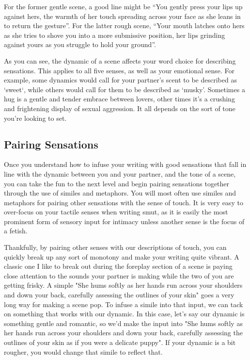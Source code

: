 ﻿\documentclass[Coomer-main.tex]{subfiles}
\begin{document}
For the former gentle scene, a good line might be “You gently press your lips up against hers, the warmth of her touch spreading across your face as she leans in to return the gesture”.
For the latter rough scene, “Your mouth latches onto hers as she tries to shove you into a more submissive position, her lips grinding against yours as you struggle to hold your ground”.

As you can see, the dynamic of a scene affects your word choice for describing sensations.
This applies to all five senses, as well as your emotional sense.
For example, some dynamics would call for your partner's scent to be described as ‘sweet‘, while others would call for them to be described as ‘musky’.
Sometimes a hug is a gentle and tender embrace between lovers, other times it’s a crushing and frightening display of sexual aggression.
It all depends on the sort of tone you're looking to set.

\subsection{Pairing Sensations}

Once you understand how to infuse your writing with good sensations that fall in line with the dynamic between you and your partner, and the tone of a scene, you can take the fun to the next level and begin pairing sensations together through the use of similes and metaphors.
You will most often use similes and metaphors for pairing other sensations with the sense of touch.
It is very easy to over-focus on your tactile senses when writing smut, as it is easily the most prominent form of sensory input for intimacy unless another sense is the focus of a fetish.

Thankfully, by pairing other senses with our descriptions of touch, you can quickly break up any sort of monotony and make your writing quite vibrant.
A classic one I like to break out during the foreplay section of a scene is paying close attention to the sounds your partner is making while the two of you are getting frisky.
A simple "She hums softly as her hands run across your shoulders and down your back, carefully assessing the outlines of your skin" goes a very long way for making a scene pop.
To infuse a simile into that input, we can tack on something that works with our dynamic.
In this case, let's say our dynamic is something gentle and romantic, so we'd make the input into "She hums softly as her hands run across your shoulders and down your back, carefully assessing the outlines of your skin as if you were a delicate puppy".
If your dynamic is a bit rougher, you would change that simile to reflect that.
\end{document}
